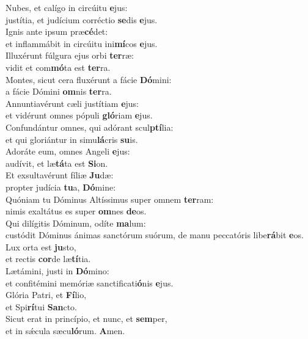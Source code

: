 \evenverse Nubes, et calígo in circúitu \textbf{e}jus:~\*\\
\evenverse justítia, et judícium corréctio \textbf{se}dis \textbf{e}jus.\\
\oddverse Ignis ante ipsum præ\textbf{cé}det:~\*\\
\oddverse et inflammábit in circúitu ini\textbf{mí}cos \textbf{e}jus.\\
\evenverse Illuxérunt fúlgura ejus orbi \textbf{ter}ræ:~\*\\
\evenverse vidit et com\textbf{mó}ta est \textbf{ter}ra.\\
\oddverse Montes, sicut cera fluxérunt a fácie \textbf{Dó}mini:~\*\\
\oddverse a fácie Dómini \textbf{om}nis \textbf{ter}ra.\\
\evenverse Annuntiavérunt cæli justítiam \textbf{e}jus:~\*\\
\evenverse et vidérunt omnes pópuli \textbf{gló}riam \textbf{e}jus.\\
\oddverse Confundántur omnes, qui adórant scul\textbf{ptí}lia:~\*\\
\oddverse et qui gloriántur in simu\textbf{lá}cris \textbf{su}is.\\
\evenverse Adoráte eum, omnes Angeli \textbf{e}jus:~\*\\
\evenverse audívit, et læ\textbf{tá}ta est \textbf{Si}on.\\
\oddverse Et exsultavérunt fíliæ \textbf{Ju}dæ:~\*\\
\oddverse propter judícia \textbf{tu}a, \textbf{Dó}mine:\\
\evenverse Quóniam tu Dóminus Altíssimus super omnem \textbf{ter}ram:~\*\\
\evenverse nimis exaltátus es super \textbf{om}nes \textbf{de}os.\\
\oddverse Qui dilígitis Dóminum, odíte \textbf{ma}lum:~\*\\
\oddverse custódit Dóminus ánimas sanctórum suórum, de manu peccatóris libe\textbf{rá}bit \textbf{e}os.\\
\evenverse Lux orta est \textbf{ju}sto,~\*\\
\evenverse et rectis \textbf{cor}de læ\textbf{tí}tia.\\
\oddverse Lætámini, justi in \textbf{Dó}mino:~\*\\
\oddverse et confitémini memóriæ sanctificati\textbf{ó}nis \textbf{e}jus.\\
\evenverse Glória Patri, et \textbf{Fí}lio,~\*\\
\evenverse et Spi\textbf{rí}tui \textbf{San}cto.\\
\oddverse Sicut erat in princípio, et nunc, et \textbf{sem}per,~\*\\
\oddverse et in sǽcula sæcu\textbf{ló}rum. \textbf{A}men.\\
